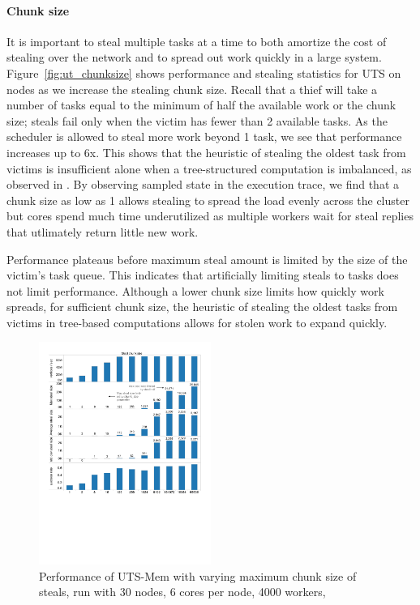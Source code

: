 \paragraph{Chunk size}

It is important to steal multiple tasks at a time to both amortize the
cost of stealing over the network and to spread out work quickly in a
large system. Figure~\ref{fig:ut_chunksize} shows performance and
stealing statistics for UTS on  nodes as we increase the stealing chunk size. Recall
that a thief will take a number of tasks equal to the minimum of half
the available work or the chunk size; steals fail only when the victim
has fewer than 2 available tasks. As the scheduler is allowed to
steal more work beyond 1 task, we see that performance increases up to 6x. This
shows that the heuristic of stealing the oldest task from victims is
insufficient alone when a tree-structured computation is imbalanced,
as observed in \cite{UTS}. By observing sampled state in the execution
trace, we find that a chunk size as low as 1 allows stealing to
spread the load evenly across the cluster but cores spend much time
underutilized as multiple workers wait for steal replies that
utlimately return little new work.

Performance plateaus before maximum steal amount is limited by the
size of the victim's task queue. This indicates that artificially limiting steals
to  tasks does not limit performance. Although a lower
chunk size limits how quickly work spreads, for sufficient chunk size,
the heuristic of stealing the oldest tasks from victims in tree-based computations allows for
stolen work to expand quickly.


\begin{figure}[ht]
    \begin{center}
      \includegraphics[width=0.5\textwidth]{figs/uts_chunksize.pdf}
    \end{center}
    \caption{Performance of UTS-Mem with varying maximum chunk size of
    steals, run with 30 nodes, 6 cores per node, 4000 workers,
    }
    \label{fig:uts_chunksize}
\end{figure}


